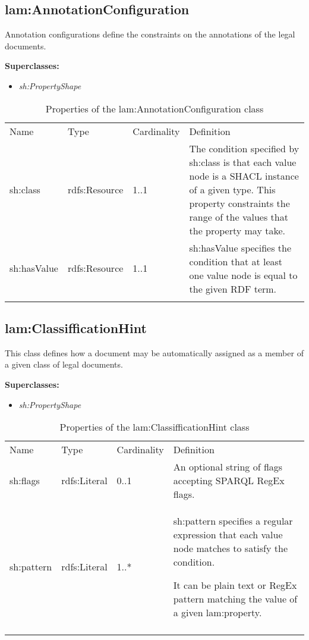 \subsection{lam:AnnotationConfiguration}

Annotation configurations define the constraints on the annotations of
the legal documents.

\textbf{Superclasses:}

\begin{itemize}
\itemsep1pt\parskip0pt
\item
  \emph{sh:PropertyShape}
\end{itemize}

{
	\footnotesize
	\selectfont%
	\begin{longtable}[c]{@{}p{3cm}p{2cm}p{2cm}p{7.8cm}@{}}
		\toprule\addlinespace
		Name & Type & Cardinality & Definition
		\\\addlinespace
		\midrule\endhead
		sh:class & rdfs:Resource & 1..1 & The condition specified by sh:class is
		that each value node is a SHACL instance of a given type. This property
		constraints the range of the values that the property may take.
		\\\addlinespace
		sh:hasValue & rdfs:Resource & 1..1 & sh:hasValue specifies the condition
		that at least one value node is equal to the given RDF term.
		\\\addlinespace
		\bottomrule
		\addlinespace
		\caption{Properties of the lam:AnnotationConfiguration class}
	\end{longtable}
}

\subsection{lam:ClassifficationHint}

This class defines how a document may be automatically assigned as a
member of a given class of legal documents.

\textbf{Superclasses:}

\begin{itemize}
\itemsep1pt\parskip0pt
\item
  \emph{sh:PropertyShape}
\end{itemize}

{
	\footnotesize
	\selectfont%
	\begin{longtable}[c]{@{}p{3cm}p{2cm}p{2cm}p{7.8cm}@{}}
		\toprule\addlinespace
		Name & Type & Cardinality & Definition
		\\\addlinespace
		\midrule\endhead
		sh:flags & rdfs:Literal & 0..1 & An optional string of flags accepting
		SPARQL RegEx flags.
		\\\addlinespace
		sh:pattern & rdfs:Literal & 1..* & sh:pattern specifies a regular
		expression that each value node matches to satisfy the condition.
		
		It can be plain text or RegEx pattern matching the value of a given
		lam:property.
		\\\addlinespace
		\bottomrule
		\addlinespace
		\caption{Properties of the lam:ClassifficationHint class}
	\end{longtable}
}

